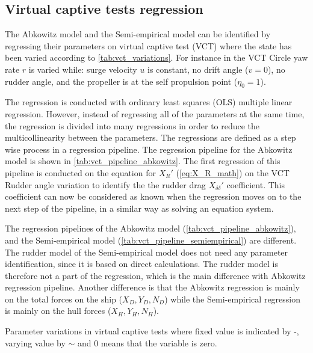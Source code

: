 \subsection{Virtual captive tests regression}
\label{sec:VCT_regression}
The Abkowitz model and the Semi-empirical model can be identified by regressing their parameters on virtual captive test (VCT) where the state has been varied according to \autoref{tab:vct_variations}. For instance in the VCT Circle yaw rate $r$ is varied while: surge velocity $u$ is constant, no drift angle ($v=0$), no rudder angle, and the propeller is at the self propulsion point ($\eta_0=1$).

The regression is conducted with ordinary least squares (OLS) multiple linear regression. However, instead of regressing all of the parameters at the same time, the regression is divided into many regressions in order to reduce the multicollinearity between the parameters. The regressions are defined as a step wise process in a regression pipeline. The regression pipeline for the Abkowitz model is shown in \autoref{tab:vct_pipeline_abkowitz}. The first regression of this pipeline is conducted on the equation for ${X_R}'$ (\autoref{eq:X_R_math}) on the VCT Rudder angle variation to identify the the rudder drag ${X_{\delta\delta}}'$ coefficient. This coefficient can now be considered as known when the regression moves on to the next step of the pipeline, in a similar way as solving an equation system.

The regression pipelines of the Abkowitz model (\autoref{tab:vct_pipeline_abkowitz}), and the Semi-empirical model (\autoref{tab:vct_pipeline_semiempirical}) are different. The rudder model of the Semi-empirical model does not need any parameter identification, since it is based on direct calculations. The rudder model is therefore not a part of the regression, which is the main difference with Abkowitz regression pipeline. Another difference is that the Abkowitz regression is mainly on the total forces on the ship ($X_D,Y_D,N_D$) while the Semi-empirical regression is mainly on the hull forces ($X_H,Y_H,N_H$).

\begin{table}[h!]
    \centering
    \caption{Parameter variations in virtual captive tests where fixed value is indicated by -, varying value by $\sim$ and 0 means that the variable is zero.}
    \label{tab:vct_variations}
\end{table}

